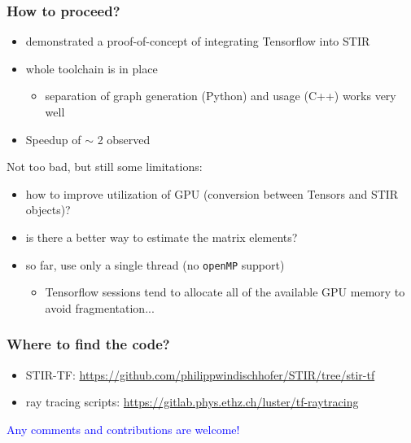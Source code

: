 \documentclass{beamer}
\begin{document}
\begin{frame}
  \frametitle{How to proceed?}
  \begin{itemize}
    \item demonstrated a proof-of-concept of integrating Tensorflow into STIR
    \item whole toolchain is in place
      \begin{itemize}
        \item separation of graph generation (Python) and usage (C++) works very well
      \end{itemize}
    \item Speedup of $\sim$ 2 observed
  \end{itemize}

  Not too bad, but still some limitations:
  \begin{itemize}
    \item how to improve utilization of GPU (conversion between Tensors and STIR objects)?
    \item is there a better way to estimate the matrix elements?
    \item so far, use only a single thread (no \texttt{openMP} support)
      \begin{itemize}
        \item Tensorflow sessions tend to allocate all of the available GPU memory to avoid fragmentation...
      \end{itemize}
  \end{itemize}

\end{frame}

\begin{frame}
  \frametitle{Where to find the code?}
  \begin{itemize}
    \item STIR-TF: \url{https://github.com/philippwindischhofer/STIR/tree/stir-tf}
    \item ray tracing scripts: \url{https://gitlab.phys.ethz.ch/luster/tf-raytracing}
  \end{itemize}

  \begin{center}
    \textcolor{blue}{Any comments and contributions are welcome!}
  \end{center}

\end{frame}
\end{document}
